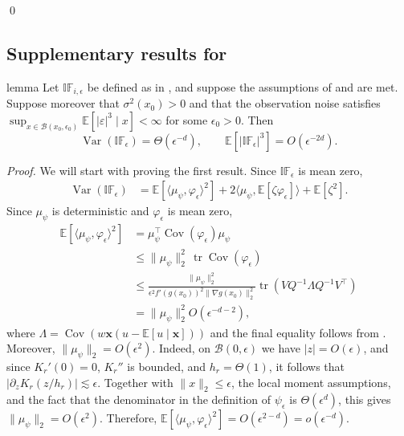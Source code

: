 \documentclass[11pt]{article}
\begin{document}
\begin{appendices}
\qed{}

\subsection{Supplementary results for }
\begin{restatable}{lemma}{}
  Let $\mathbb{IF}_{i, \epsilon}$ be defined as in , and suppose the assumptions of  and  are met. Suppose moreover that $\sigma^2(x_0)>0$ and that the observation noise satisfies $\sup_{x\in\mathcal{B}(x_0,\epsilon_0)}\mathbb{E}[|\varepsilon|^3\mid x]<\infty$ for some $\epsilon_0>0$. Then
  \[\operatorname{Var}(\mathbb{IF}_{\epsilon}) = \Theta(\epsilon^{-d}), \qquad \mathbb{E}[|\mathbb{IF}_{\epsilon}|^3] = O(\epsilon^{-2d}).\]
  \label{lemma: if bound}
\end{restatable}
\noindent \textit{Proof.} We will start with proving the first result. Since $\mathbb{IF}_{\epsilon}$ is mean zero,
\begin{align*}
    \operatorname{Var}(\mathbb{IF}_{\epsilon})
    &= \mathbb{E}[\langle \mu_{\psi}, \varphi_{\epsilon}\rangle^2]
    + 2\langle \mu_{\psi}, \mathbb{E}[\zeta \varphi_{\epsilon}]\rangle
    + \mathbb{E}[\zeta^2].
\end{align*}
Since $\mu_\psi$ is deterministic and $\varphi_{\epsilon}$ is mean zero,
\begin{align*}
    \mathbb{E}[\langle \mu_{\psi}, \varphi_{\epsilon}\rangle^2]
    &= \mu_\psi^{\top}\operatorname{Cov}(\varphi_{\epsilon})\mu_\psi \\
    &\leq \|\mu_\psi\|_2^2\,\operatorname{tr}\operatorname{Cov}(\varphi_{\epsilon}) \\
    &\leq \frac{\|\mu_\psi\|_2^2}{\epsilon^2f'(g(x_0))^2\|\nabla g(x_0)\|_2^2}
    \operatorname{tr}(VQ^{-1}\Lambda Q^{-1}V^{\top}) \\
    &= \|\mu_\psi\|_2^2 O(\epsilon^{-d-2}),
\end{align*}
where $\Lambda=\operatorname{Cov}(w\boldsymbol{x}(u-\mathbb{E}[u\mid \boldsymbol{x}]))$ and the final equality follows from . Moreover, $\|\mu_\psi\|_2=O(\epsilon^2)$. Indeed, on $\mathcal{B}(0,\epsilon)$ we have $|z|=O(\epsilon)$, and since $K_r'(0)=0$, $K_r''$ is bounded, and $h_r=\Theta(1)$, it follows that $|\partial_zK_r(z/h_r)|\lesssim\epsilon$. Together with $\|x\|_2\leq\epsilon$, the local moment assumptions, and the fact that the denominator in the definition of $\psi_\epsilon$ is $\Theta(\epsilon^d)$, this gives $\|\mu_\psi\|_2=O(\epsilon^2)$. Therefore, $\mathbb{E}[\langle \mu_{\psi}, \varphi_{\epsilon}\rangle^2]=O(\epsilon^{2-d})=o(\epsilon^{-d})$.


\end{appendices}
\end{document}

